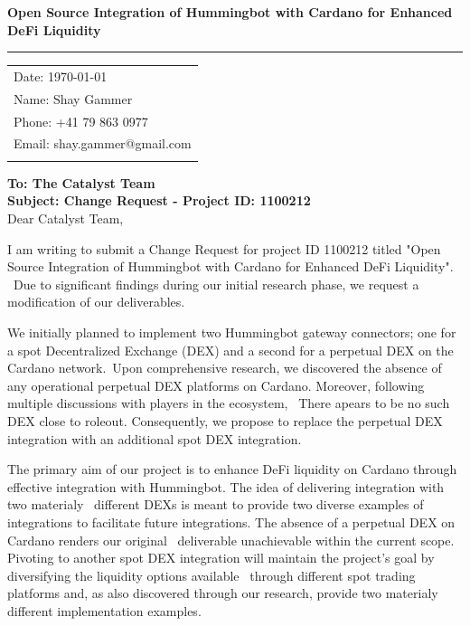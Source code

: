 \documentclass{article}
\begin{document}
\bigskip\bigskip
\textbf{Open Source Integration of Hummingbot with Cardano for Enhanced DeFi Liquidity} 

\vspace{-1em} %
\rule{\linewidth}{1pt} %


\begin{flushright}
    \begin{tabular}{l @{}}
        Date: \today\\ %
        Name: Shay Gammer \\
        Phone: +41 79 863 0977\\
        Email: shay.gammer@gmail.com\\
        \\
    \end{tabular}
\end{flushright}

\textbf{To: The Catalyst Team} \\
    
\textbf{Subject: Change Request - Project ID: 1100212} \\

Dear Catalyst Team,


I am writing to submit a Change Request for project ID 1100212 titled "Open Source Integration of Hummingbot with Cardano for Enhanced DeFi Liquidity". \
 Due to significant findings during our initial research phase, we request a modification of our deliverables.

We initially planned to implement two Hummingbot gateway connectors; one for a spot Decentralized Exchange (DEX) and a second for a perpetual DEX on the Cardano network.\
Upon comprehensive research, we discovered the absence of any operational perpetual DEX platforms on Cardano. Moreover, following multiple discussions with players in the ecosystem, \
There apears to be no such DEX close to roleout. Consequently, we propose to replace the perpetual DEX integration with an additional spot DEX integration.

The primary aim of our project is to enhance DeFi liquidity on Cardano through effective integration with Hummingbot. The idea of delivering integration with two materialy \
different DEXs is meant to provide two diverse examples of integrations to facilitate future integrations. The absence of a perpetual DEX on Cardano renders our original \
deliverable unachievable within the current scope. Pivoting to another spot DEX integration will maintain the project's goal by diversifying the liquidity options available \
through different spot trading platforms and, as also discovered through our research, provide two materialy different implementation examples.
\end{document}
